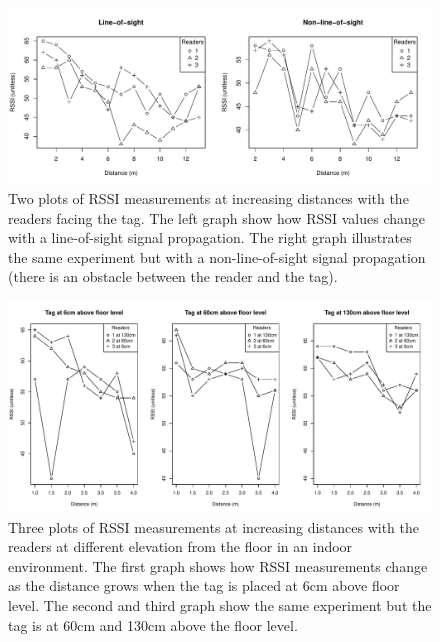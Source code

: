 \begin{figure}
	\begin{center}
		\includegraphics[width=1\textwidth]{figures/rssi_distance_13m}
		\caption{Two plots of RSSI measurements at increasing distances with the readers facing the tag. The left graph show how RSSI values change with a line-of-sight signal propagation. The right graph illustrates the same experiment but with a non-line-of-sight signal propagation (there is an obstacle between the reader and the tag).}
	\end{center}
\end{figure}
\begin{figure}
	\begin{center}
		\includegraphics[width=1\textwidth]{figures/rssi_distance_4m}
		\caption{Three plots of RSSI measurements at increasing distances with the readers at different elevation from the floor in an indoor environment. The first graph shows how RSSI measurements change as the distance grows when the tag is placed at 6cm above floor level. The second and third graph show the same experiment but the tag is at 60cm and 130cm above the floor level.}
	\end{center}
\end{figure}

